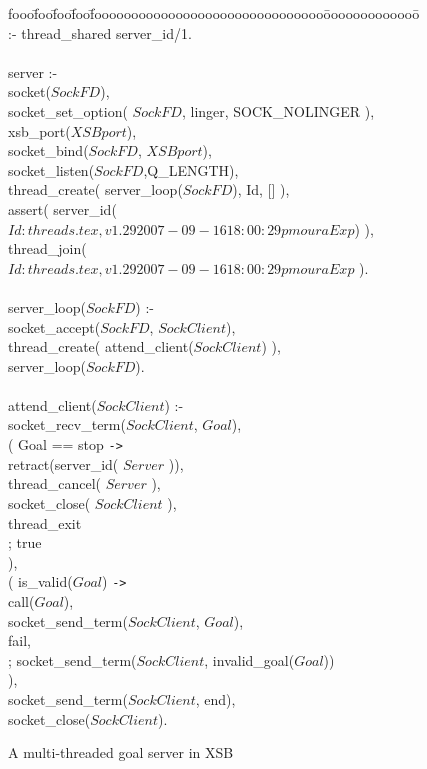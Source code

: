 \begin{figure}
\begin{center}
\begin{tt}
\begin{tabbing}
fooo\=foo\=foo\=foo\=fooooooooooooooooooooooooooooooo\=ooooooooooooo\=\kill
\> :- thread\_shared server\_id/1. \\
\\
\> server :-\\
\> \> socket($SockFD$),\\
\> \> socket\_set\_option( $SockFD$, linger, SOCK\_NOLINGER ),\\
\> \> xsb\_port($XSBport$),\\
\> \> socket\_bind($SockFD$, $XSBport$),\\
\> \> socket\_listen($SockFD$,Q\_LENGTH),\\
\> \> thread\_create( server\_loop($SockFD$), Id, [] ),\\
\> \> assert( server\_id($Id: threads.tex,v 1.29 2007-09-16 18:00:29 pmoura Exp $) ),\\
\> \> thread\_join( $Id: threads.tex,v 1.29 2007-09-16 18:00:29 pmoura Exp $ ).\\
\\
\> server\_loop($SockFD$) :-\\
\> \> socket\_accept($SockFD$, $SockClient$),\\
\> \> thread\_create( attend\_client($SockClient$) ),\\
\> \> server\_loop($SockFD$).\\
\\
\> attend\_client($SockClient$) :-\\
\> \> socket\_recv\_term($SockClient$, $Goal$),\\
\> \> ( \> Goal == stop \verb|->| \\
\> \> \> retract(server\_id( $Server$ )),\\
\> \> \> thread\_cancel( $Server$ ),\\
\> \> \> socket\_close( $SockClient$ ),\\
\> \> \> thread\_exit\\
\> \> ; \> true\\
\> \> ),\\
\> \> ( \> is\_valid($Goal$) \verb|->|\\
\> \> \> call($Goal$), \\
\> \> \> socket\_send\_term($SockClient$, $Goal$),\\
\> \> \> fail,\\
\> \> ;	\> socket\_send\_term($SockClient$, invalid\_goal($Goal$))\\
\> \> ),\\
\> \> socket\_send\_term($SockClient$, end),\\
\> \> socket\_close($SockClient$).
\end{tabbing}
\end{tt}
\end{center}
\caption{A multi-threaded goal server in XSB}
\label{fig:ex-server}
\end{figure}

